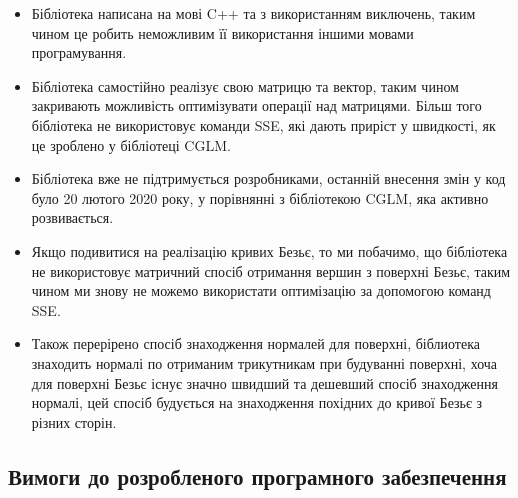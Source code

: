 \let\mypdfximage\pdfximage\def\pdfximage{\immediate\mypdfximage}\documentclass[14pt,a4paper]{extarticle}
\theoremstyle{definition}
\renewcommand{\[}{\begin{singlespace}\begin{equation*}}
\renewcommand{\]}{\end{equation*}\end{singlespace}}
\renewcommand{\+}{\discretionary{\mbox{\scriptsize$\hookleftarrow$}}{}{}}
\begin{document}
\begin{itemize}
\item Бібліотека написана на мові C++ та з використанням виключень, таким чином це робить неможливим її використання іншими мовами програмування.
\item Бібліотека самостійно реалізує свою матрицю та вектор, таким чином закривають можливість оптимізувати операції над матрицями. Більш того бібліотека не  використовує команди SSE, які дають приріст у швидкості, як це зроблено у бібліотеці CGLM.
\item Бібліотека вже не підтримується розробниками, останній внесення змін у код було 20 лютого 2020 року, у порівнянні з бібліотекою CGLM, яка активно розвивається.
\item Якщо подивитися на реалізацію кривих Безьє, то ми побачимо, що бібліотека не використовує матричний спосіб отримання вершин з поверхні Безьє, таким чином ми знову не можемо використати оптимізацію за допомогою команд SSE.
\item Також перерірено спосіб знаходження нормалей для поверхні, біблиотека знаходить нормалі по отриманим трикутникам при будуванні поверхні, хоча для поверхні Безьє існує значно швидший та дешевший спосіб знаходження нормалі, цей спосіб будується на знаходження похідних до кривої Безьє з різних сторін.
\end{itemize}

\subsection{Вимоги до розробленого програмного забезпечення}
\end{document}
